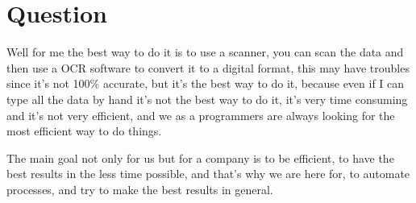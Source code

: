 \documentclass{article}
\begin{document}
\section{Question}
Well for me the best way to do it is to use a scanner, you can scan the data and then
use a OCR software to convert it to a digital format, this may have troubles since it's not
100\% accurate, but it's the best way to do it, because even if I can type all the data by hand
it's not the best way to do it, it's very time consuming and it's not very efficient, and we
as a programmers are always looking for the most efficient way to do things.

The main goal not only for us but for a company is to be efficient, to have the best results
in the less time possible, and that's why we are here for, to automate processes, and
try to make the best results in general.
\end{document}
